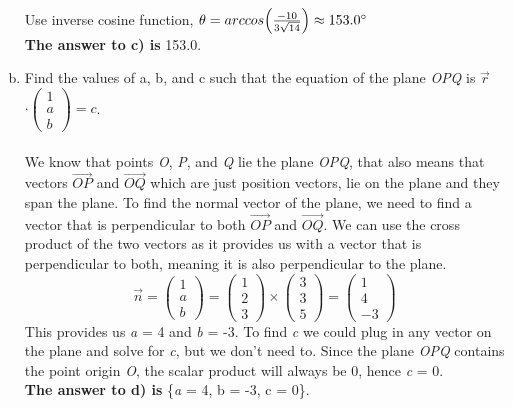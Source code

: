 \documentclass{article}
\begin{document}
\begin{enumerate}[a)]
Use inverse cosine function, \(\theta = arccos\Big(\frac{-10}{3\sqrt{14}}\Big) \approx 153.0\degree\)
\\\textbf{The answer to c) is }153.0\degree. 
\item Find the values of a, b, and c such that the equation of the plane \textit{OPQ} is \(\vec{r}\) \(\cdot \begin{pmatrix}1 \\ a \\ b \end{pmatrix} = c\).
\\ \\
We know that points \textit{O}, \textit{P}, and \textit{Q} lie the plane \textit{OPQ}, that also means that vectors \(\overrightarrow{OP}\) and \(\overrightarrow{OQ}\) which are just position vectors, lie on the plane and they span the plane. To find the normal vector of the plane, we need to find a vector that is perpendicular to both \(\overrightarrow{OP}\) and \(\overrightarrow{OQ}\). We can use the cross product of the two vectors as it provides us with a vector that is perpendicular to both, meaning it is also perpendicular to the plane.
$$\vec{n} = \begin{pmatrix}1 \\ a \\ b \end{pmatrix} =\begin{pmatrix}1 \\ 2 \\ 3 \end{pmatrix} \times \begin{pmatrix}3 \\ 3 \\ 5 \end{pmatrix} = \begin{pmatrix}1 \\ 4 \\ -3 \end{pmatrix}$$This provides us \textit{a} = 4 and \textit{b} = -3. To find \textit{c} we could plug in any vector on the plane and solve for \textit{c}, but we don't need to. Since the plane \textit{OPQ} contains the point origin \textit{O}, the scalar product will always be 0, hence \textit{c} = 0.
\\
\textbf{The answer to d) is} \{\textit{a} = 4, {b} = -3, {c} = 0\}.


\end{enumerate}
\end{document}
